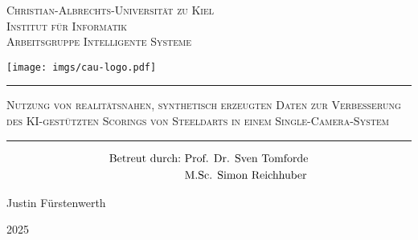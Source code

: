 
\begin{titlepage}
    \centering

    {\LARGE \scshape Christian-Albrechts-Universität zu Kiel}\\
    \vspace{0.25cm}
    {\large \scshape Institut für Informatik}\\
    \vspace{0.1cm}
    {\large \scshape Arbeitsgruppe Intelligente Systeme}

    \vfill

    \texttt{[image: imgs/cau-logo.pdf]}

    \vfill

    {\Huge \scshape {}}

    \vspace{0.75cm}

    \hrule
    \vspace{0.5cm}
    {\LARGE \scshape Nutzung von realitätsnahen, synthetisch erzeugten}
    \vspace{0.15cm}
    {\LARGE \scshape Daten zur Verbesserung des KI-gestützten Scorings}
    \vspace{0.15cm}
    {\LARGE \scshape von Steeldarts in einem Single-Camera-System}
    \vspace{0.5cm}
    \hrule
    \begin{align*}
        \text{Betreut durch:} & \text{\,\,Prof. Dr. Sven Tomforde} \\
                              & \text{\,\,M.Sc. Simon Reichhuber}
    \end{align*}

    \vfill

    {\Large Justin Fürstenwerth}

    \vspace{0.2cm}

    {\large 2025}




\end{titlepage}
